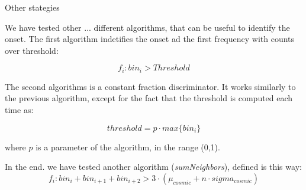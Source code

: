 \documentclass[9pt]{beamer}
\begin{document}
\begin{frame}{Other stategies}

We have tested other ... different algorithms, that can be useful to identify the onset. The first algorithm indetifies the onset ad the first frequency with counts over threshold:

\begin{equation}
f_{i} : bin_{i} > Threshold
\end{equation}

The second algorithms is a constant fraction discriminator. It works similarly to the previous algorithm, except for the fact that the threshold is computed each time as:

\begin{equation}
threshold = p \cdot max\{bin_{i}  \}
\end{equation}

where $p$ is a parameter of the algorithm, in the range (0,1).

In the end. we have tested another algorithm (\textit{sumNeighbors}), defined is this way:
\begin{equation}
f_{i} : bin_{i} + bin_{i+1} + bin_{i +2} > 3\cdot (\mu_{cosmic} + n \cdot sigma_{cosmic}) 
\end{equation}

\end{frame}
\end{document}
